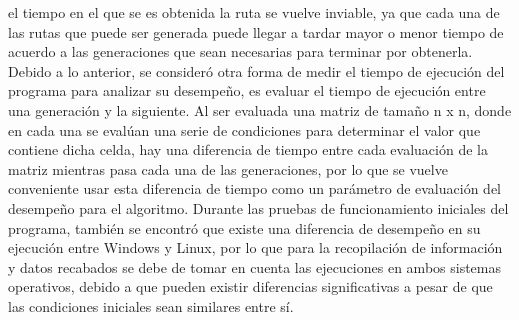         el tiempo en el que se es obtenida la ruta se vuelve inviable,
        ya que cada una de las rutas que puede ser generada puede
        llegar a tardar mayor o menor tiempo de acuerdo a las
        generaciones que sean necesarias para terminar por
        obtenerla.
    \vskip 0.5cm
    Debido a lo anterior, se consider\'o otra forma de medir el
    tiempo de ejecuci\'on del programa para analizar su
    desempe\~no, es evaluar el tiempo de ejecuci\'on entre una
    generaci\'on y la siguiente. Al ser evaluada una matriz de
    tama\~no n x n, donde en cada una se eval\'uan una serie de
    condiciones para determinar el valor que contiene dicha
    celda, hay una diferencia de tiempo entre cada evaluaci\'on de
    la matriz mientras pasa cada una de las generaciones, por lo
    que se vuelve conveniente usar esta diferencia de tiempo
    como un par\'ametro de evaluaci\'on del desempe\~no para el
    algoritmo.
    \vskip 0.5cm
    Durante las pruebas de funcionamiento iniciales del
        programa, tambi\'en se encontr\'o que existe una diferencia de
        desempe\~no en su ejecuci\'on entre Windows y Linux, por lo
        que para la recopilaci\'on de informaci\'on y datos recabados se
        debe de tomar en cuenta las ejecuciones en ambos sistemas
        operativos, debido a que pueden existir diferencias
        significativas a pesar de que las condiciones iniciales sean
        similares entre s\'i.
